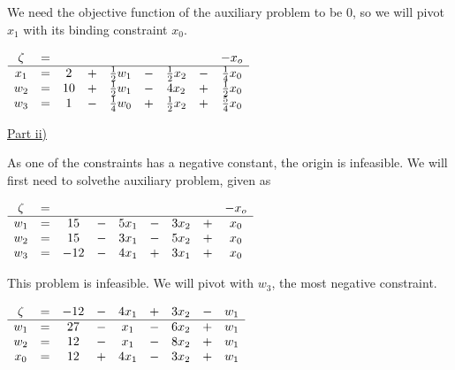 \documentclass[letterpaper,12pt]{article}
\begin{document}
We need the objective function of the auxiliary problem to be 0, so we will pivot $x_1$ with its binding constraint $x_0$.
\begin{center}
	$\begin{array}{ c c c c c c c c c c }
	\zeta & = &  &   &      &   &      &   & -x_o \\
	\hline
	x_1 & = & 2 & + & \frac{1}{2}w_1 & - & \frac{1}{2}x_2 & - & \frac{1}{4}x_0 \\
	w_2 & = & 10  & + & \frac{1}{2}w_1 & - & 4x_2 & + & \frac{1}{2}x_0 \\
	w_3 & = & 1  & - & \frac{1}{4}w_0  & +  &  \frac{1}{2}x_2 & + & \frac{5}{4}x_0 \\
	\end{array}$ \\
\end{center}

\underline{Part ii)}

As one of the constraints has a negative constant, the origin is infeasible. We will first need to solvethe auxiliary problem, given as
\begin{center}
	$\begin{array}{ c c c c c c c c c c }
	\zeta & = &  &   &      &   &      &   & -x_o \\
	\hline
	w_1 & = & 15 & - & 5x_1 & - & 3x_2 & + & x_0 \\
	w_2 & = & 15  & - & 3x_1 & - & 5x_2 & + & x_0 \\
	w_3 & = & -12  & - & 4x_1  & + &  3x_1 & + & x_0 \\
	\end{array}$ \\
\end{center}

This problem is infeasible. We will pivot with $w_3$, the most negative constraint.
\begin{center}
	$\begin{array}{ c c c c c c c c c c }
	\zeta & = & -12 & - & 4x_1 & + & 3x_2 & - & w_1 \\
	\hline
	w_1 & = & 27 & - & x_1 & - & 6x_2 & + & w_1 \\
	w_2 & = & 12  & - & x_1 & - & 8x_2 & + & w_1 \\
	x_0 & = & 12  & + & 4x_1  & -  &  3x_2 & + & w_1 \\
	\end{array}$ \\
\end{center}
\end{document}
